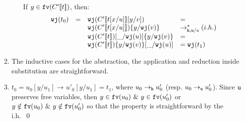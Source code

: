 \documentclass{LMCS}
\renewcommand{\>}{\rightarrow}
\newcommand{\Rew}[1]{\rightarrow_{#1}}
\newcommand{\Rewnmod}[2]{\rightarrow^*_{#1/#2}}
\newcommand{\Rewplusmod}[2]{\rightarrow^+_{#1/#2}}
\newcommand{\isubs}[1]{ \{ #1  \} }
\newcommand{\dis}{{\tt j}}
\newcommand{\fv}[1]{{\tt fv}(#1)}
\newcommand{\proj}{\wfc}
\newcommand{\Gc}{{\tt w}}
\newcommand{\ih}{i.h.}
\newcommand{\wfc}{\Gc\dis}
\newcommand{\unboxed}{{\tt u}}
\newcommand{\ignore}[1]{}
\newcommand{\osym}{{\tt o}}
\newcommand{\New}{{\tt h}}
\newcommand{\ctx}[2]{#1 [ \! [#2] \! ]}
\newcommand{\void}{\_}
\begin{document}
\begin{enumerate}[$\bullet$]
\begin{enumerate}[$-$]
If $y \in \fv{\ctx{C'}{t}}$, then:
        \[ \begin{array}{lllll} 
           \proj(t_0)&=&\proj(\ctx{C'}{t[x/u]}[y/v]) &= \\
&&\proj(\ctx{C'}{t[x/u]})\isubs{y/\proj(v)}&\Rewnmod{\New, \unboxed}{\osym} (\ih)\\
&&\proj(\ctx{C'}{t})[\void/\proj(u)]\isubs{y/\proj(v)}& =\\
 &&\proj(\ctx{C'}{t})\isubs{y/\proj(v)}[\void/\proj(u)]& = \proj(t_1) 
           \end{array} \] 
           
\ignore{If  $x \in \fv{\ctx{C'}{t}}$, 
Then we conclude by using the \ih\ and 
 Lemma~\ref{l:newu-pass-to-sub} if $y \in \fv{\ctx{C'}{t}}$. }



     \end{enumerate}
\item The inductive cases for the  abstraction, the application 
      and reduction inside substitution are straightforward. 

\ignore{
\item $t_0 = u_0[y/u_1] \Rew{} u_0[y/u'_1] =t_1$, where $u_1
  \Rew{\New} u'_1$ (resp. $u_1 \Rew{\unboxed} u'_1$).
        
        If $y \in \fv{u_0}$, then:
         \[ \begin{array}{ll}
           \proj(t_0) = \proj(u_0)\isubs{y/\proj(u_1)}  &\Rewplusmod{\New, \unboxed}{\osym}\ (resp. \Rewnmod{\New, \unboxed}{\osym})\  (\ih) \\
        \proj(u_0)\isubs{y/\proj(u'_1)}         &  = \proj(t_1)   
        \end{array} \]
       
        If $y \notin \fv{u_0}$, then:

          \[ \begin{array}{ll}
           \proj(t_0) = \proj(u_0)[y/\proj(u_1)]  &\Rewplusmod{\New, \unboxed}{\osym}\ (resp. \Rewnmod{\New, \unboxed}{\osym})\  (\ih) \\
        \proj(u_0)[y/\proj(u'_1)]         &  = \proj(t_1)   
        \end{array} \]

}       

\item $t_0  = u_0[y/u_1] \Rew{} u'_0[y/u_1] =t_1$, where $u_0
  \Rew{\New} u'_0$ (resp. $u_0 \Rew{\unboxed} u'_0$).
       Since $\unboxed$ preserves free variables, then
  $y \in \fv{u_0}\ \&\ y
  \in \fv{u'_0}$ or $y \notin \fv{u_0}\ \&\ y \notin \fv{u'_0}$ 
so that the
  property is straightforward by the \ih\
\qed
\end{enumerate}
\end{document}
